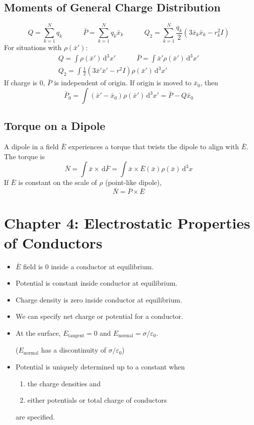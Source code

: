 \documentclass[11pt]{article}
\newcommand{\eps}{\varepsilon_0}
\newcommand{\dd}{\,\mathrm{d}}
\begin{document}
\subsection{Moments of General Charge Distribution}

\[
  Q = \sum_{k=1}^{N}q_k
  \qquad\quad
  \bar{P} = \sum_{k=1}^{N}q_k\bar{x}_k
  \qquad\quad
  Q_2 = \sum_{k=1}^{N}\frac{q_k}{2}\left(3\bar{x}_k\bar{x}_k - r_k^2I\right)
\]
For situations with $\rho(\bar{x}')$:
\begin{gather*}
  Q = \int\rho(\bar{x}')\dd^3x'
  \qquad\quad
  \bar{P} = \int\bar{x}'\rho(\bar{x}')\dd^3x'\\[1ex]
  Q_2 = \int\frac{1}{2}\left(3\bar{x}'\bar{x}' - r^2I\right)\rho(\bar{x}')\dd^3x'
\end{gather*}
If charge is $0$, $\bar{P}$ is independent of origin. If origin is moved to $\bar{x}_0$, then
\[
  \bar{P}_0 = \int(\bar{x}'-\bar{x}_0)\rho(\bar{x}')\dd^3x' = \bar{P}-Q\bar{x}_0
\]

\subsection{Torque on a Dipole}

A dipole in a field $\bar{E}$ experiences a torque that twists the dipole to align with $\bar{E}$. The torque is
\[
  \bar{N} = \int\bar{x}\times\dd\bar{F} = \int\bar{x}\times\bar{E}(\bar{x})\rho(\bar{x})\dd^3x
\]
If $\bar{E}$ is constant on the scale of $\rho$ (point-like dipole),
\[
  \bar{N} = \bar{P}\times\bar{E}
\]

\section{Chapter 4: Electrostatic Properties of Conductors}

\begin{itemize}
  \item $\bar{E}$ field is $0$ inside a conductor at equilibrium.
  \item Potential is constant inside conductor at equilibrium.
  \item Charge density is zero inside conductor at equilibrium.
  \item We can specify net charge or potential for a conductor.
  \item At the surface, $E_{\text{tangent}}=0$ and $E_{\text{normal}}=\sigma/\eps$.
  \par\hspace*{1.5em}($E_{\text{normal}}$ has a discontinuity of $\sigma/\eps$)
  \newpage
  \item Potential is uniquely determined up to a constant when
  \begin{enumerate}
    \item[a)] the charge densities and
    \item[b)] either potentials or total charge of conductors
  \end{enumerate}
  are specified.
\end{itemize}
\end{document}
